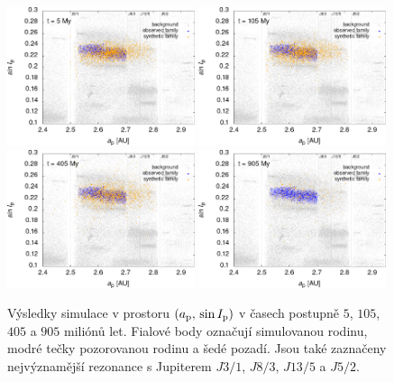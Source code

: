 \documentclass[A4paper, 12pt, oneside]{book}
\begin{document}
\immediate{}
\immediate{}
\immediate{}
\immediate{}
\begin{figure}
	\centering
	\includegraphics[width=0.49\textwidth]{obr/ai_5t.png}
	\includegraphics[width=0.49\textwidth]{obr/ai_105t.png}\\
	\includegraphics[width=0.49\textwidth]{obr/ai_405t.png}
	\includegraphics[width=0.49\textwidth]{obr/ai_905t.png}
	\caption{Výsledky simulace v prostoru $(a_{\rm p},\,\sin I_{\rm p})$ v časech postupně $5$, $105$, $405$ a $905$ miliónů let. Fialové body označují simulovanou rodinu, modré tečky pozorovanou rodinu a šedé pozadí. Jsou také zaznačeny nejvýznamější rezonance s Jupiterem $J3/1$, $J8/3$, $J13/5$ a $J5/2$.} \label{fig:ae_sim}
\end{figure}
\end{document}
